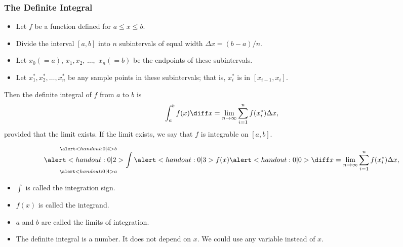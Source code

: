 \begin{frame}\frametitle{ %
The Definite Integral}
\begin{definition}
\begin{itemize}
\item  Let $f$ be a function defined for $a\leq x\leq b$.
\item  Divide the interval $[a,b]$ into $n$ subintervals of equal width $\Delta x = (b-a)/n$.  
\item  Let $x_0 (=a)$, $x_1, x_2$, $\ldots ,$ $x_n (=b)$ be the endpoints of these subintervals.
\item  Let $x_1^*, x_2^*, \ldots , x_n^*$ be any sample points in these subintervals; that is, $x_i^*$ is in $[x_{i-1},x_i]$.  
\end{itemize}
Then the definite integral of $f$ from $a$ to $b$ is
\abovedisplayskip=0pt
\belowdisplayskip=0pt
\[
\int_a^b f(x) \diff x = \lim_{n\to \infty} \sum_{i=1}^n f(x_i^*)\Delta x,
\]
provided that the limit exists.  If the limit exists, we say that $f$ is integrable on $[a,b]$.
\end{definition}
\end{frame}

\begin{frame}
\[
\mathop{\alert<handout:0| 2>{\int}}_{\alert<handout:0| 4>{a}}^{\alert<handout:0| 4>{b}} \alert<handout:0| 3>{f(x)} \alert<handout:0| 0>{\diff x} = \lim_{n\to \infty} \sum_{i=1}^n f(x_i^*)\Delta x,
\]
\begin{itemize}
\item<1-| alert@2>  $\int$ is called the integration sign.
\item<1-| alert@3>  $f(x)$ is called the integrand.
\item<1-| alert@4>  $a$ and $b$ are called the limits of integration.
\item<5->  The definite integral is a number.  It does not depend on $x$.  We could use any variable instead of $x$.
\end{itemize}
%
\end{frame}
